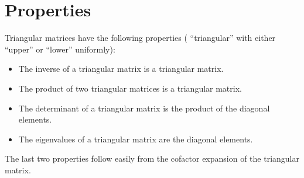 \documentclass{article}
\begin{document}
\section{Properties}

Triangular matrices have the following properties ( ``triangular'' with either ``upper'' or ``lower'' uniformly):

\begin{itemize}
\item The inverse of a triangular matrix is a triangular matrix.
\item The product of two triangular matrices is a triangular matrix.
\item The determinant of a triangular matrix is the product of the diagonal elements.
\item The eigenvalues of a triangular matrix are the diagonal elements.
\end{itemize}

The last two properties follow easily from the cofactor expansion of the triangular matrix.
\end{document}
